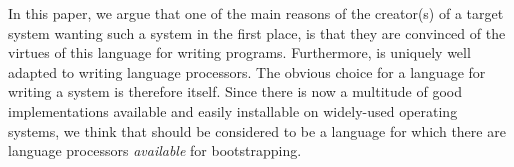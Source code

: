 In this paper, we argue that one of the main reasons of the creator(s)
of a target \commonlisp{} system wanting such a system in the first
place, is that they are convinced of the virtues of this language for
writing programs.  Furthermore, \commonlisp{} is uniquely well adapted
to writing language processors.  The obvious choice for a language for
writing a \commonlisp{} system is therefore \commonlisp{} itself.
Since there is now a multitude of good \commonlisp{} implementations
available and easily installable on widely-used operating systems, we
think that \commonlisp{} should be considered to be a language for
which there are language processors \emph{available} for
bootstrapping.
